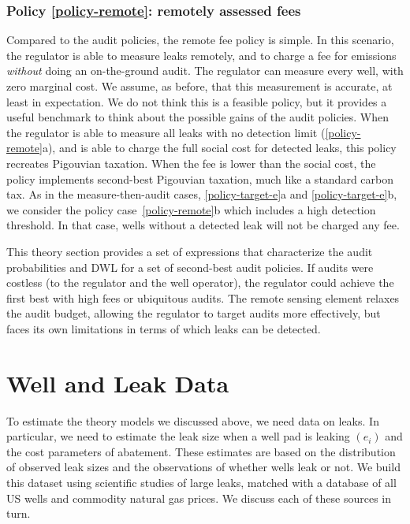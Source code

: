 \subsubsection{Policy \ref{policy-remote}: remotely assessed fees}
\label{sec:remotely-assessed-fees}

Compared to the audit policies, the remote fee policy is simple.
In this scenario, the regulator is able to measure leaks remotely, and to charge a fee for emissions \emph{without} doing an on-the-ground audit.
The regulator can measure every well, with zero marginal cost.
We assume, as before, that this measurement is accurate, at least in expectation.
We do not think this is a feasible policy, but it provides a useful benchmark to think about the possible gains of the audit policies.
When the regulator is able to measure all leaks with no detection limit (\ref{policy-remote}a),
and is able to charge the full social cost for detected leaks, this policy recreates Pigouvian taxation.
When the fee is lower than the social cost, the policy implements second-best Pigouvian taxation, much like a standard carbon tax.
As in the measure-then-audit cases, \ref{policy-target-e}a and \ref{policy-target-e}b, we consider the policy case~\ref{policy-remote}b which includes a high detection threshold.
In that case, wells without a detected leak will not be charged any fee.



This theory section provides a set of expressions that characterize the audit probabilities and \gls{DWL} for a set of second-best audit policies.
If audits were costless (to the regulator and the well operator), the regulator could achieve the first best with high fees or ubiquitous audits.
The remote sensing element relaxes the audit budget, allowing the regulator to target audits more effectively, but faces its own limitations in terms of which leaks can be detected.

\section{Well and Leak Data}
\label{sec:well-and-leak-data}

To estimate the theory models we discussed above, we need data on leaks.
In particular, we need to estimate the leak size when a well pad is leaking \((e_i)\) and the cost parameters of abatement.
These estimates are based on the distribution of observed leak sizes and the observations of whether wells leak or not.
We build this dataset using scientific studies of large leaks, matched with a database of all US wells and commodity natural gas prices.
We discuss each of these sources in turn.


